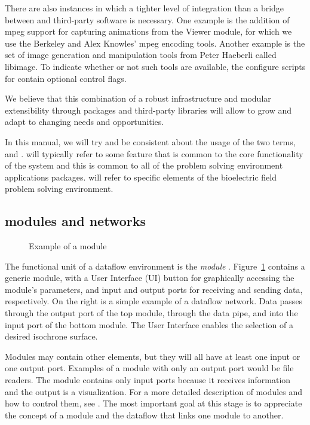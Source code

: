 There are also instances in which a tighter level of integration than a
bridge between \SR{} and third-party software is necessary.  One example
is the addition of mpeg support for capturing animations from the \SR{}
Viewer module, for which we use the Berkeley and Alex Knowles' mpeg
encoding tools.  Another example is the set of image generation and
manipulation tools from Peter Haeberli called libimage.  To indicate
whether or not such tools are available, the configure scripts for \SR{}
contain optional control flags.

We believe that this combination of a robust infrastructure and modular
extensibility through packages and third-party libraries will allow \SR{}
to grow and adapt to changing needs and opportunities. 

In this manual, we will try and be consistent about the usage of the two
terms, \SR{} and \PSE{}.  \SR{} will typically refer to some feature that
is common to the core functionality of the system and this is common to all
of the problem solving environment applications packages.  \PSE{} will
refer to specific elements of the bioelectric field problem solving
environment.


\subsection{\SR{} modules and networks}
\label{sec:con-modules} 


\begin{figure}[htb]
  \begin{makeimage}
  \end{makeimage}
  \basicmodule
  \caption{\label{fig:conc-module} Example of a \SR{} module}
\end{figure}

The functional unit of a dataflow environment is the {\em\/module}
.  Figure~\ref{fig:conc-module} contains a generic \SR{}
module, with a User Interface (UI) button for graphically accessing the
module's parameters, and input and output ports for receiving and sending
data, respectively.  On the right is a simple example of a dataflow
network.  Data passes through the output port of the top module, through
the data pipe, and into the input port of the bottom module.  The User
Interface enables the selection of a desired isochrone surface.

Modules may contain other elements, but they will all have at least one
input or one output port.  Examples of a module with only an output port
would be file readers.  The 
module contains only input ports because it receives information and the
output is a visualization.  For a more detailed description of modules and
how to control them, see .
The most important goal at this stage is to appreciate the concept of a
module and the dataflow that links one module to another.

